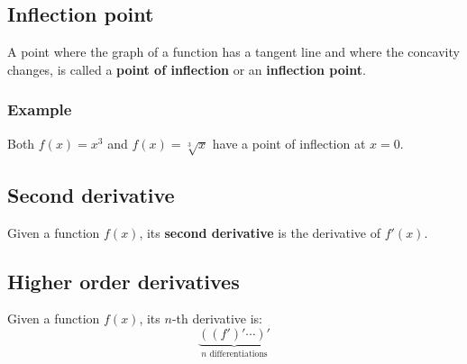 \documentclass[11pt]{article}
\begin{document}
\newpage

\subsection{Inflection point}
\label{sec:orga30c384}
A point where the graph of a function has a tangent line and where the concavity changes, is called a \textbf{point of inflection} or an \textbf{inflection point}.

\subsubsection{Example}
\label{sec:orga3d4f34}
Both \(f(x) = x^3\) and \(f(x) =\sqrt[3]{x}\) have a point of inflection at \(x = 0\).
\\[0pt]

\begin{center}
\end{center}

\begin{center}
\end{center}

\newpage

\subsection{Second derivative}
\label{sec:orgd064f65}
Given a function \(f(x)\), its \textbf{second derivative} is the derivative of \(f'(x)\).

\subsection{Higher order derivatives}
\label{sec:org2ee7e95}
Given a function \(f(x)\), its \(n\)-th derivative is:
\[\underbrace{((f')' \cdots )'}_{n \text{ differentiations}}\]
\end{document}
